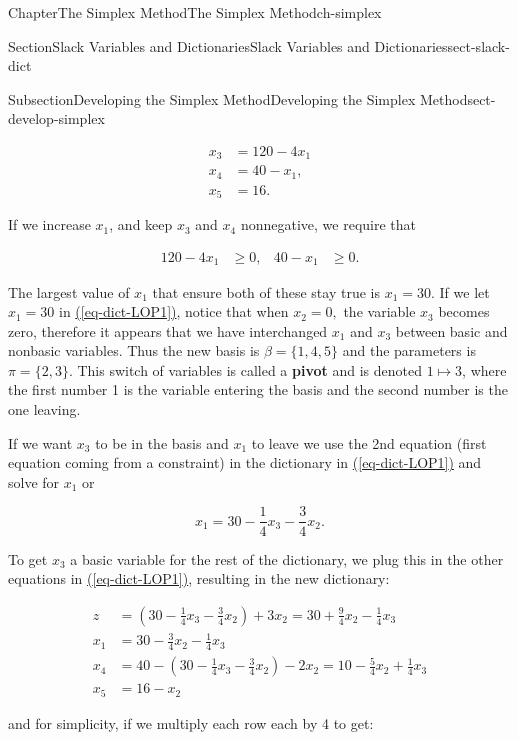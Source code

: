 \documentclass[oneside,10pt,]{book}
\newcommand{\xreffont}{\relax}
\newcommand{\terminology}[1]{\textbf{#1}}
\numberwithin{equation}{section}
\newcommand{\amp}{&}
\begin{document}
\begin{chapterptx}{Chapter}{The Simplex Method}{}{The Simplex Method}{}{}{ch-simplex}
\begin{sectionptx}{Section}{Slack Variables and Dictionaries}{}{Slack Variables and Dictionaries}{}{}{sect-slack-dict}
\begin{subsectionptx}{Subsection}{Developing the Simplex Method}{}{Developing the Simplex Method}{}{}{sect-develop-simplex}
\par
%
\begin{align*}
x_3\amp= 120-4x_1 \\
x_4\amp= 40 -x_1, \\
x_5\amp= 16.
\end{align*}
%
\par
If we increase \(x_1\), and keep \(x_3\) and \(x_4\) nonnegative, we require that%
\par
%
\begin{align*}
120 -4x_1\amp\geq 0,\amp40-x_1\amp\geq 0.
\end{align*}
%
\par
The largest value of \(x_1\) that ensure both of these stay true is \(x_1=30\). If we let \(x_1=30\) in \hyperref[eq-dict-LOP1]{({\xreffont\ref{eq-dict-LOP1}})}, notice that when \(x_2=0,\) the variable \(x_3\) becomes zero, therefore it appears that we have interchanged \(x_1\) and \(x_3\) between basic and nonbasic variables. Thus the new basis is \(\beta=\{1,4,5\}\) and the parameters is \(\pi = \{2,3\}\). This switch of variables is called a \terminology{pivot} and is denoted \(1 \mapsto 3\), where the first number 1 is the variable entering the basis and the second number is the one leaving.%
\par
If we want \(x_3\) to be in the basis and \(x_1\) to leave we use the 2nd equation (first  equation coming from a constraint) in the dictionary in \hyperref[eq-dict-LOP1]{({\xreffont\ref{eq-dict-LOP1}})} and solve for \(x_1\) or%
\par
%
\begin{equation*}
x_1= 30 -\frac{1}{4}x_3 - \frac{3}{4}x_2.
\end{equation*}
%
\par
To get \(x_3\) a basic variable for the rest of the dictionary, we plug this in the other equations in \hyperref[eq-dict-LOP1]{({\xreffont\ref{eq-dict-LOP1}})}, resulting in the new dictionary:%
\par
%
\begin{align*}
z\amp= \left(30 -\frac{1}{4}x_3 - \frac{3}{4}x_2\right) + 3 x_2 =  30+\frac{9}{4}x_2 - \frac{1}{4}x_3 \\
x_1\amp = 30 - \frac{3}{4}x_2 - \frac{1}{4}x_3 \\
x_4\amp= 40 - \left(30 -\frac{1}{4}x_3 - \frac{3}{4}x_2\right) - 2x_2 = 10-\frac{5}{4}x_2 +\frac{1}{4}x_3\\
x_5\amp= 16-x_2
\end{align*}
%
\par
and for simplicity, if we multiply each row each by 4 to get:%

\end{subsectionptx}
\end{sectionptx}
\end{chapterptx}
\end{document}
